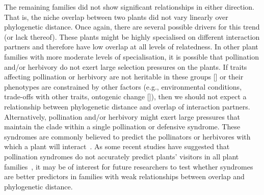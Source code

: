 \documentclass[12pt]{article}
\begin{document}
\begin{spacing}{1.5}
  The remaining families did not show significant relationships 
  in either direction. That is, the niche overlap between two 
  plants did not vary linearly over phylogenetic distance. Once again, there 
  are several possible drivers for this trend (or lack thereof). These plants might 
  be highly specialised on different interaction partners and therefore
  have low overlap at all levels of relatedness. In other plant families
  with more moderate levels of specialisation, it is possible 
  that pollination and/or herbivory do not exert large
  selection pressures on the plants. If traits affecting pollination
  or herbivory are not heritable in these groups [\citealp{Kursar2009}] 
  or their phenotypes are constrained by other factors (e.g., 
  environmental conditions, trade-offs with other traits, ontogenic
  change [\citealp{Karinho2014}]), then we should not expect a relationship 
  between phylogenetic distance and overlap of interaction partners.
  Alternatively, pollination and/or herbivory might exert large 
  pressures that maintain the clade within a single pollination or 
  defensive syndrome. These syndromes are commonly believed to
  predict the pollinators or herbivores with which a plant will 
  interact~\citep{Waser1996,Fenster2004,Ollerton2009,Johnson2014}.
  As some recent studies have suggested that pollination syndromes
  do not accurately predict plants' visitors in all plant 
  families~\citep{Ollerton2009},
  it may be of interest for future researchers to test whether 
  syndromes are better predictors in families with weak 
  relationships between overlap and phylogenetic distance.



\end{spacing}
\end{document}
